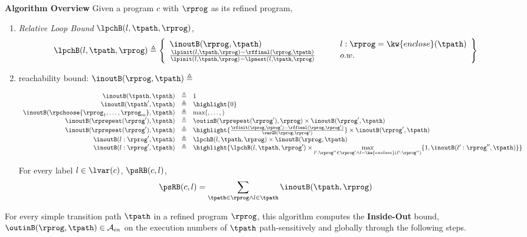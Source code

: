 \textbf{Algorithm Overview} 
Given a program $c$ with $\rprog$ as its refined program,
\begin{enumerate}
  \item 
  \emph{Relative Loop Bound} $\lpchB(l, \tpath, \rprog)$,
  \[
    \lpchB(l, \tpath, \rprog) \triangleq
    \left\{
    \begin{array}{ll}
      \inoutB(\rprog, \tpath)
      & \qquad{ l:\rprog = \kw{enclose}(\tpath)}
      \\
      \frac{\lpinit(l, \tpath, \rprog) - \rffinal(\rprog, \tpath)}{\lpinit(l, \tpath, \rprog) - \lpnext(l, \tpath, \rprog)}
      & \qquad o.w.
    \end{array}
    \right\}
    \]
    \item  reachability bound:
    $\inoutB(\rprog, \tpath) \triangleq $

    \[
      \begin{array}{rcl}
        \inoutB(\tpath, \tpath) & \triangleq & 1 \\
        \inoutB(\tpath', \tpath) & \triangleq & \highlight{0} \\
        \inoutB(\rpchoose{\rprog_1, \ldots, \rprog_m }, \tpath) & \triangleq & \max(, \ldots, ) \\
        \inoutB(\rprepeat(\rprog'), \tpath) & \triangleq & \outinB(\rprepeat(\rprog'), \rprog) \times \inoutB(\rprog', \tpath)\\
        \inoutB(\rprepeat(\rprog'), \tpath) & \triangleq 
        & \highlight{\frac{\rfinit(\rprog, \rprog') - \rffinal(\rprog, \rprog')}{\varGD(\rprog, \rprog')}}
         \times \inoutB(\rprog', \tpath)
         \\
        \inoutB(l: \rprog', \tpath) & \triangleq & \lpchB(l, \tpath, \rprog) \times \inoutB(\rprog, \tpath) \\
        \inoutB(l: \rprog', \tpath) & \triangleq & 
        \highlight{
          \lpchB(l, \tpath, \rprog') \times 
        \max\limits_{l':\rprog'' \in \rprog' \land l = \kw{enclose}(l':\rprog'')}
       \{1, \inoutB(l':\rprog'', \tpath)\} }
        \\
        \end{array}
      \]
    
     For every label $l \in \lvar(c)$, $\psRB(c, l)$,
    \[ 
      \psRB(c, l) = \sum\limits_{\tpath \in \rprog \land 
    l \in \tpath} \inoutB(\tpath, \rprog)
    \]

\end{enumerate}


For every simple transition path $\tpath$ in a refined program $\rprog$, 
this algorithm
computes the \textbf{Inside-Out} bound, $\outinB(\rprog, \tpath) \in \mathcal{A}_{in}$
on the execution numbers of $\tpath$ path-sensitively and globally
through the following steps.

